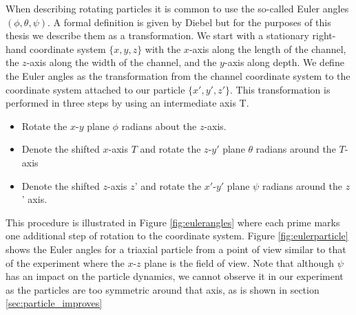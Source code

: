 When describing rotating particles it is common to use the so-called Euler angles $(\phi, \theta, \psi)$. A formal definition is given by Diebel \cite{Euler} but for the purposes of this thesis we describe them as a transformation. We start with a stationary right-hand coordinate system $\{x,y,z\}$ with the $x$-axis along the length of the channel, the $z$-axis along the width of the channel, and the $y$-axis along depth. We define the Euler angles as the transformation from the channel coordinate system to the coordinate system attached to our particle $\{x',y',z'\}$. This transformation is performed in three steps by using an intermediate axis T.

\begin{itemize}
\item Rotate the $x$-$y$ plane $\phi$ radians about the $z$-axis. 
\item Denote the shifted $x$-axis $T$ and rotate the $z$-$y'$ plane $\theta$ radians around the $T$-axis
\item Denote the shifted $z$-axis $z$' and rotate the $x'$-$y'$ plane $\psi$ radians around the $z$' axis.
\end{itemize}

This procedure is illustrated in Figure \ref{fig:eulerangles} where each prime marks one additional step of rotation to the coordinate system. Figure \ref{fig:eulerparticle} shows the Euler angles for a triaxial particle from a point of view similar to that of the experiment where the $x$-$z$ plane is the field of view. Note that although $\psi$ has an impact on the particle dynamics, we cannot observe it in our experiment as the particles are too symmetric around that axis, as is shown in section \ref{sec:particle_improves}


